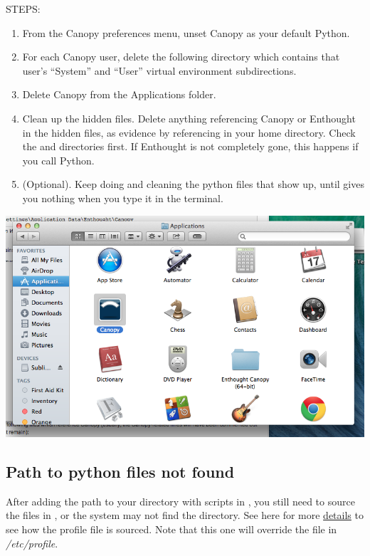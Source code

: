 \documentclass[letterpaper,10pt,english]{sphinxmanual}
\begin{document}
STEPS:
\begin{enumerate}
\item {} 
From the Canopy preferences menu, unset Canopy as your default Python.

\item {} 
For each Canopy user, delete the following directory which contains that user’s ``System'' and ``User'' virtual environment subdirections.

\item {} 
Delete Canopy from the Applications folder.

\item {} 
Clean up the hidden files. Delete anything referencing Canopy or Enthought in the hidden files, as evidence by referencing  in your home directory. Check the  and  directories first. If Enthought is not completely gone, this happens if you call Python.

\item {} 
(Optional). Keep doing  and cleaning the python files that show up, until  gives you nothing when you type it in the terminal.

\end{enumerate}

\includegraphics{applications_canopy.png}


\subsection{Path to python files not found}
\label{docfiles/install_dependencies:path-to-python-files-not-found}
After adding the path to your directory with scripts in , you still need to source the  files in , or the system may not find the directory. See here for more \href{http://publib.boulder.ibm.com/infocenter/pseries/v5r3/index.jsp?topic=/com.ibm.aix.baseadmn/doc/baseadmndita/prof\_file.htm}{details} to see how the profile file is sourced. Note that this one will override the file in \emph{/etc/profile}.
\end{document}
